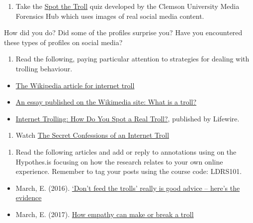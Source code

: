 \documentclass[
]{book}
\providecommand{\tightlist}{%
  \setlength{\itemsep}{0pt}\setlength{\parskip}{0pt}}
\theoremstyle{definition}
\theoremstyle{definition}
\theoremstyle{definition}
\theoremstyle{definition}
\theoremstyle{remark}
\begin{document}
\begin{reflect}
\begin{enumerate}
\def\labelenumi{\arabic{enumi}.}
\tightlist
\item
  Take the \href{https://spotthetroll.org/}{Spot the Troll} quiz developed by the Clemson University Media Forensics Hub which uses images of real social media content.
\end{enumerate}

How did you do? Did some of the profiles surprise you? Have you encountered these types of profiles on social media?

\begin{enumerate}
\def\labelenumi{\arabic{enumi}.}
\setcounter{enumi}{1}
\tightlist
\item
  Read the following, paying particular attention to strategies for dealing with trolling behaviour.
\end{enumerate}

\begin{itemize}
\tightlist
\item
  \href{https://en.wikipedia.org/wiki/Troll_(slang)}{The Wikipedia article for internet troll}\\
\item
  \href{https://meta.wikimedia.org/wiki/What_is_a_troll\%3F}{An essay published on the Wikimedia site: What is a troll?}\\
\item
  \href{https://www.lifewire.com/what-is-internet-trolling-3485891}{Internet Trolling: How Do You Spot a Real Troll?}, published by Lifewire.
\end{itemize}

\begin{enumerate}
\def\labelenumi{\arabic{enumi}.}
\setcounter{enumi}{2}
\tightlist
\item
  Watch \href{https://www.youtube.com/watch?v=5BQp3V_34BE}{The Secret Confessions of an Internet Troll}
\end{enumerate}

\begin{enumerate}
\def\labelenumi{\arabic{enumi}.}
\setcounter{enumi}{3}
\tightlist
\item
  Read the following articles and add or reply to annotations using on the Hypothes.is focusing on how the research relates to your own online experience. Remember to tag your posts using the course code: LDRS101.
\end{enumerate}

\begin{itemize}
\tightlist
\item
  March, E. (2016). \href{https://theconversation.com/dont-feed-the-trolls-really-is-good-advice-heres-the-evidence-63657}{`Don't feed the trolls' really is good advice -- here's the evidence}
\item
  March, E. (2017). \href{https://theconversation.com/how-empathy-can-make-or-break-a-troll-80680}{How empathy can make or break a troll}
\end{itemize}


\end{reflect}
\end{document}
